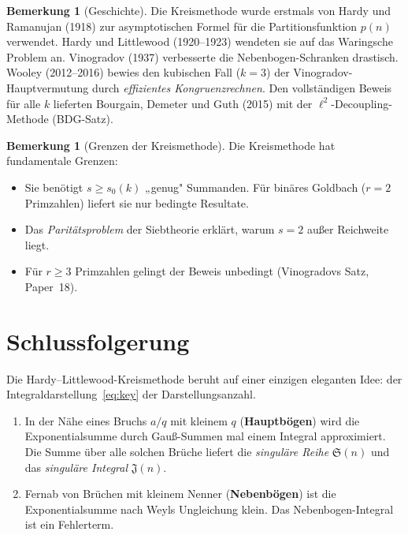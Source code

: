 \documentclass[12pt,a4paper]{amsart}
\theoremstyle{definition}
\newtheorem{bemerkung}[theorem]{Bemerkung}
\begin{document}
\begin{bemerkung}[Geschichte]
  Die Kreismethode wurde erstmals von Hardy und Ramanujan (1918) zur
  asymptotischen Formel für die Partitionsfunktion $p(n)$ verwendet.
  Hardy und Littlewood (1920--1923) wendeten sie auf das Waringsche
  Problem an.  Vinogradov (1937) verbesserte die Nebenbogen-Schranken
  drastisch.  Wooley (2012--2016) bewies den kubischen Fall ($k=3$) der
  Vinogradov-Hauptvermutung durch \emph{effizientes Kongruenzrechnen}.
  Den vollständigen Beweis für alle $k$ lieferten Bourgain, Demeter und Guth
  (2015) mit der $\ell^2$-Decoupling-Methode (BDG-Satz).
\end{bemerkung}

\begin{bemerkung}[Grenzen der Kreismethode]
  Die Kreismethode hat fundamentale Grenzen:
  \begin{itemize}
    \item Sie benötigt $s \geq s_0(k)$ „genug" Summanden.  Für binäres
      Goldbach ($r = 2$ Primzahlen) liefert sie nur bedingte Resultate.
    \item Das \emph{Paritätsproblem} der Siebtheorie erklärt, warum
      $s = 2$ außer Reichweite liegt.
    \item Für $r \geq 3$ Primzahlen gelingt der Beweis unbedingt
      (Vinogradovs Satz, Paper~18).
  \end{itemize}
\end{bemerkung}

\section{Schlussfolgerung}

Die Hardy--Littlewood-Kreismethode beruht auf einer einzigen eleganten
Idee: der Integraldarstellung~\eqref{eq:key} der Darstellungsanzahl.

\begin{enumerate}
  \item In der Nähe eines Bruchs $a/q$ mit kleinem $q$
    (\textbf{Hauptbögen}) wird die Exponentialsumme durch
    Gauß-Summen mal einem Integral approximiert.  Die Summe über
    alle solchen Brüche liefert die \emph{singuläre Reihe} $\mathfrak{S}(n)$
    und das \emph{singuläre Integral} $\mathfrak{J}(n)$.
  \item Fernab von Brüchen mit kleinem Nenner (\textbf{Nebenbögen})
    ist die Exponentialsumme nach Weyls Ungleichung klein.
    Das Nebenbogen-Integral ist ein Fehlerterm.
\end{enumerate}
\end{document}
